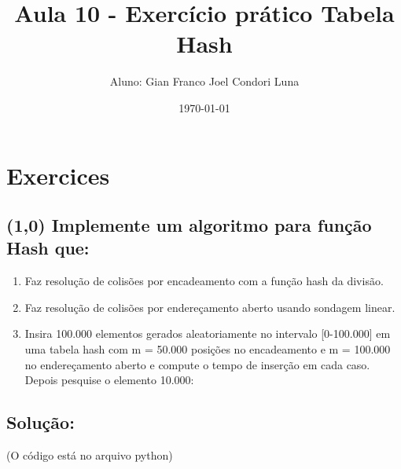 \documentclass{article}
\title{Aula 10 - Exercício prático Tabela Hash}
\author{Aluno: Gian Franco Joel Condori Luna}
\date{\today}
\begin{document}
\maketitle

\section*{Exercices}
\setcounter{section}{1}
\subsection {(1,0) Implemente um algoritmo para função Hash que:}
\begin{enumerate}[label=\alph*)]
    \item Faz resolução de colisões por encadeamento com a função hash da divisão.
    \item Faz resolução de colisões por endereçamento aberto usando sondagem linear.
    \item Insira 100.000 elementos gerados aleatoriamente no intervalo [0-100.000] em uma
    tabela hash com m = 50.000 posições no encadeamento e m = 100.000 no
    endereçamento aberto e compute o tempo de inserção em cada caso. Depois pesquise
    o elemento 10.000:
\end{enumerate}

\subsection*{Solução:}

(O código está no arquivo python)
\\
\end{document}
